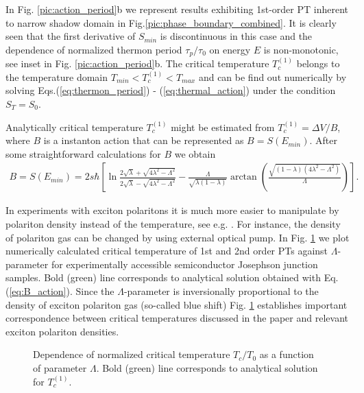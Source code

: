 \documentclass[aps, pre, preprint, groupedaddress, superscriptaddress, showkeys, showpacs] {revtex4-1}
\begin{document}
In Fig. \ref{pic:action_period}b we represent results exhibiting 1st-order PT inherent to narrow shadow domain in Fig.\ref{pic:phase_boundary_combined}.
It is clearly seen that the first derivative of $S_{min}$ is discontinuous in this case and the dependence of normalized thermon period  $\tau_p / \tau_0$ on energy $E$ is non-monotonic, see inset in Fig. \ref{pic:action_period}b.
The critical temperature $T_{c}^{(1)}$ belongs to the temperature domain $T_{min} < T_{c}^{(1)} < T_{max}$ and can be find out numerically by solving Eqs.(\ref{eq:thermon_period}) - (\ref{eq:thermal_action}) under the condition $S_T = S_0$.
 
Analytically critical temperature $T_{c}^{(1)}$ might be estimated from $T_{c}^{(1)} = \Delta V / B$, where $B$ is a instanton action that can be represented as $B = S(E_{min})$.
After some straightforward calculations for $B$ we obtain
%
\begin{equation}
\begin{array}{c}
B = S(E_{min}) = 2 s \hbar \left[ \ln \frac{2 \sqrt{\lambda} + \sqrt{4 \lambda^2 - \Lambda^2}}{2 \sqrt{\lambda} - \sqrt{4 \lambda^2 - \Lambda^2}} - \frac{\Lambda}{\sqrt{\lambda (1 - \lambda)}} \arctan \left( \frac{\sqrt{(1 - \lambda) (4 \lambda^2 - \Lambda^2)}}{\Lambda} \right) \right].
\end{array}
\label{eq:B_action}
\end{equation}
%

In experiments with exciton polaritons it is much more easier to manipulate by polariton density instead of the temperature, see e.g. \cite{Sanvitto,Guillet}.
For instance, the density of polariton gas can be changed by using external optical pump.
In Fig. \ref{pic:temperatures} we plot numerically calculated critical temperature of 1st and 2nd order PTs against $\Lambda$-parameter for experimentally accessible semiconductor Josephson junction samples.
Bold (green) line corresponds to analytical solution obtained with  Eq. (\ref{eq:B_action}).
Since the $\Lambda$-parameter is inversionally proportional to the density of exciton polariton gas (so-called blue shift) Fig. \ref{pic:temperatures} establishes important correspondence between critical temperatures discussed in the paper and relevant exciton polariton densities.
%
\begin{figure}[ht]
\caption
{Dependence of normalized critical temperature $T_{c}/T_{0}$ as a function of parameter $\Lambda$. Bold (green) line corresponds to analytical solution for  $T_{c}^{(1)}$.     
\label{pic:temperatures}}
\end{figure}
%
\end{document}
